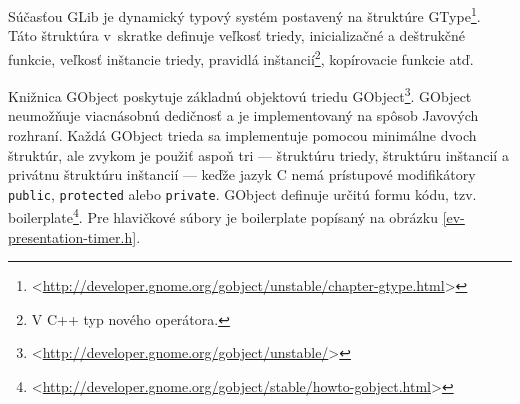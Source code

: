 \documentclass[12pt,oneside,final]{fithesis2}
\begin{document}
Súčasťou GLib je dynamický typový systém postavený na štruktúre GType\footnote{<\url{http://developer.gnome.org/gobject/unstable/chapter-gtype.html}>}. Táto štruktúra v~skratke definuje veľkosť triedy, inicializačné a deštrukčné funkcie, veľkosť inštancie triedy, pravidlá inštancií\footnote{V C++ typ nového operátora.}, kopírovacie funkcie atď.

Knižnica GObject poskytuje základnú objektovú triedu GObject\footnote{<\url{http://developer.gnome.org/gobject/unstable/}>}. GObject neumožňuje viacnásobnú dedičnosť a je implementovaný na spôsob Javových rozhraní. Každá GObject trieda sa implementuje pomocou minimálne dvoch štruktúr, ale zvykom je použiť aspoň tri --- štruktúru triedy, štruktúru inštancií a privátnu štruktúru inštancií --- keďže jazyk C nemá prístupové modifikátory \texttt{public}, \texttt{protected} alebo \texttt{private}. GObject definuje určitú formu kódu, tzv. boilerplate\footnote{<\url{http://developer.gnome.org/gobject/stable/howto-gobject.html}>}.
Pre hlavičkové súbory je boilerplate popísaný na obrázku \ref{ev-presentation-timer.h}.
\end{document}

